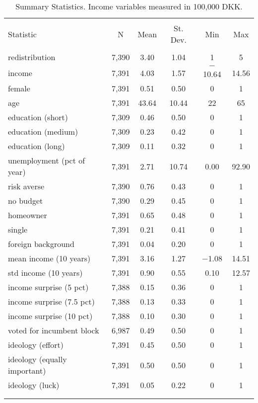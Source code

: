 
\begin{table}[!htbp] \centering 
  
\begin{tabular}{@{\extracolsep{5pt}}lccccc} 
\\[-1.8ex]\hline 
\hline \\[-1.8ex] 
Statistic & \multicolumn{1}{c}{N} & \multicolumn{1}{c}{Mean} & \multicolumn{1}{c}{St. Dev.} & \multicolumn{1}{c}{Min} & \multicolumn{1}{c}{Max} \\ 
\hline \\[-1.8ex] 
redistribution & 7,390 & 3.40 & 1.04 & 1 & 5 \\ 
income & 7,391 & 4.03 & 1.57 & $-$10.64 & 14.56 \\ 
female & 7,391 & 0.51 & 0.50 & 0 & 1 \\ 
age & 7,391 & 43.64 & 10.44 & 22 & 65 \\ 
education (short) & 7,309 & 0.46 & 0.50 & 0 & 1 \\ 
education (medium) & 7,309 & 0.23 & 0.42 & 0 & 1 \\ 
education (long) & 7,309 & 0.11 & 0.32 & 0 & 1 \\ 
unemployment (pct of year) & 7,391 & 2.71 & 10.74 & 0.00 & 92.90 \\ 
risk averse & 7,390 & 0.76 & 0.43 & 0 & 1 \\ 
no budget & 7,390 & 0.29 & 0.45 & 0 & 1 \\ 
homeowner & 7,391 & 0.65 & 0.48 & 0 & 1 \\ 
single & 7,391 & 0.21 & 0.41 & 0 & 1 \\ 
foreign background & 7,391 & 0.04 & 0.20 & 0 & 1 \\ 
mean income (10 years) & 7,391 & 3.16 & 1.27 & $-$1.08 & 14.51 \\ 
std income (10 years) & 7,391 & 0.90 & 0.55 & 0.10 & 12.57 \\ 
income surprise (5 pct) & 7,388 & 0.15 & 0.36 & 0 & 1 \\ 
income surprise (7.5 pct) & 7,388 & 0.13 & 0.33 & 0 & 1 \\ 
income surprise (10 pct) & 7,388 & 0.10 & 0.30 & 0 & 1 \\ 
voted for incumbent block & 6,987 & 0.49 & 0.50 & 0 & 1 \\ 
ideology (effort) & 7,391 & 0.45 & 0.50 & 0 & 1 \\ 
ideology (equally important) & 7,391 & 0.50 & 0.50 & 0 & 1 \\ 
ideology (luck) & 7,391 & 0.05 & 0.22 & 0 & 1 \\ 
\hline \\[-1.8ex] 
\normalsize 
\end{tabular} 
\caption{Summary Statistics. Income variables measured in 100,000 DKK.} 
  \label{summary} 
\end{table} 

